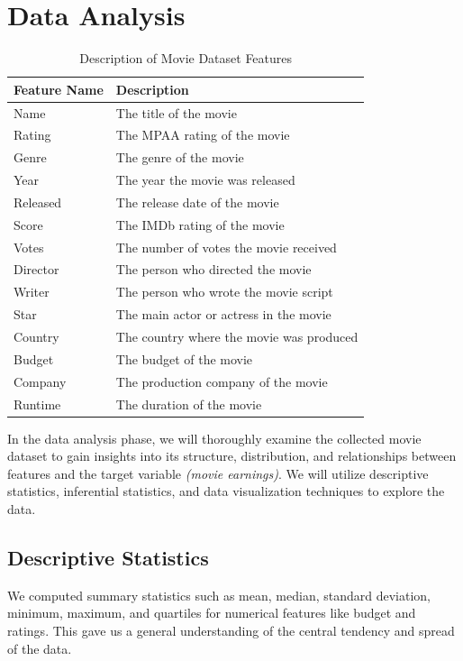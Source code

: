 \documentclass[conference]{IEEEtran}
\begin{document}
\section{Data Analysis}
   \begin{table}[h]
    \centering
    \captionsetup{justification=centering}
    \caption{Description of Movie Dataset Features}
    \label{tab:movie_dataset_features}
    \renewcommand{\arraystretch}{1.5}
        \begin{tabular}{>{\centering\arraybackslash}m{1cm} >{\centering\arraybackslash}m{6cm}}
        \toprule
        \textbf{Feature Name} & \textbf{Description} \\
        \midrule
        Name & The title of the movie \\
        Rating & The MPAA rating of the movie \\
        Genre & The genre of the movie \\
        Year & The year the movie was released \\
        Released & The release date of the movie \\
        Score & The IMDb rating of the movie \\
        Votes & The number of votes the movie received \\
        Director & The person who directed the movie \\
        Writer & The person who wrote the movie script \\
        Star & The main actor or actress in the movie \\
        Country & The country where the movie was produced \\
        Budget & The budget of the movie \\
        Company & The production company of the movie \\
        Runtime & The duration of the movie \\
        \bottomrule
    \end{tabular}
\end{table}

    In the data analysis phase, we will thoroughly examine the collected movie dataset to gain insights into its structure, distribution, and relationships between features and the target variable \textit{(movie earnings)}. We will utilize descriptive statistics, inferential statistics, and data visualization techniques to explore the data.
    
    \subsection{Descriptive Statistics}
        We computed summary statistics such as mean, median, standard deviation, minimum, maximum, and quartiles for numerical features like budget and ratings. This gave us a general understanding of the central tendency and spread of the data.
    
\end{document}
